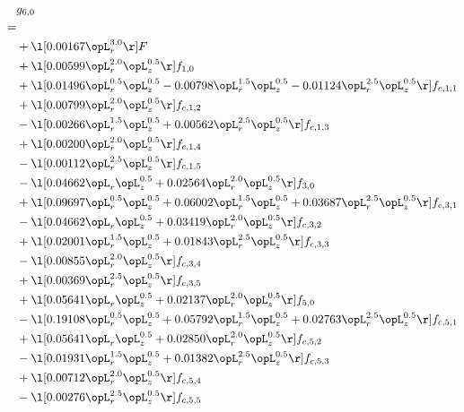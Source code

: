 \begin{alignat}{2} 
\label{eq:g_60_0} 
& g_{6,0} \nonumber \\ 
 = \\ 
& + \l[  0.00167 \opL_r^{3.0}  \r] F \nonumber \\ 
& + \l[  0.00599 \opL_r^{2.0} \opL_z^{0.5}  \r] f_{1,0} \nonumber \\ 
& + \l[  0.01496 \opL_r^{0.5} \opL_z^{0.5}   -0.00798 \opL_r^{1.5} \opL_z^{0.5}   -0.01124 \opL_r^{2.5} \opL_z^{0.5}  \r] f_{c,1,1} \nonumber \\ 
& + \l[  0.00799 \opL_r^{2.0} \opL_z^{0.5}  \r] f_{c,1,2} \nonumber \\ 
& - \l[  0.00266 \opL_r^{1.5} \opL_z^{0.5} +  0.00562 \opL_r^{2.5} \opL_z^{0.5}  \r] f_{c,1,3} \nonumber \\ 
& + \l[  0.00200 \opL_r^{2.0} \opL_z^{0.5}  \r] f_{c,1,4} \nonumber \\ 
& - \l[  0.00112 \opL_r^{2.5} \opL_z^{0.5}  \r] f_{c,1,5} \nonumber \\ 
& - \l[  0.04662 \opL_r \opL_z^{0.5} +  0.02564 \opL_r^{2.0} \opL_z^{0.5}  \r] f_{3,0} \nonumber \\ 
& + \l[  0.09697 \opL_r^{0.5} \opL_z^{0.5} +  0.06002 \opL_r^{1.5} \opL_z^{0.5} +  0.03687 \opL_r^{2.5} \opL_z^{0.5}  \r] f_{c,3,1} \nonumber \\ 
& - \l[  0.04662 \opL_r \opL_z^{0.5} +  0.03419 \opL_r^{2.0} \opL_z^{0.5}  \r] f_{c,3,2} \nonumber \\ 
& + \l[  0.02001 \opL_r^{1.5} \opL_z^{0.5} +  0.01843 \opL_r^{2.5} \opL_z^{0.5}  \r] f_{c,3,3} \nonumber \\ 
& - \l[  0.00855 \opL_r^{2.0} \opL_z^{0.5}  \r] f_{c,3,4} \nonumber \\ 
& + \l[  0.00369 \opL_r^{2.5} \opL_z^{0.5}  \r] f_{c,3,5} \nonumber \\ 
& + \l[  0.05641 \opL_r \opL_z^{0.5} +  0.02137 \opL_r^{2.0} \opL_z^{0.5}  \r] f_{5,0} \nonumber \\ 
& - \l[  0.19108 \opL_r^{0.5} \opL_z^{0.5} +  0.05792 \opL_r^{1.5} \opL_z^{0.5} +  0.02763 \opL_r^{2.5} \opL_z^{0.5}  \r] f_{c,5,1} \nonumber \\ 
& + \l[  0.05641 \opL_r \opL_z^{0.5} +  0.02850 \opL_r^{2.0} \opL_z^{0.5}  \r] f_{c,5,2} \nonumber \\ 
& - \l[  0.01931 \opL_r^{1.5} \opL_z^{0.5} +  0.01382 \opL_r^{2.5} \opL_z^{0.5}  \r] f_{c,5,3} \nonumber \\ 
& + \l[  0.00712 \opL_r^{2.0} \opL_z^{0.5}  \r] f_{c,5,4} \nonumber \\ 
& - \l[  0.00276 \opL_r^{2.5} \opL_z^{0.5}  \r] f_{c,5,5} \nonumber \\ 
\end{alignat} 


